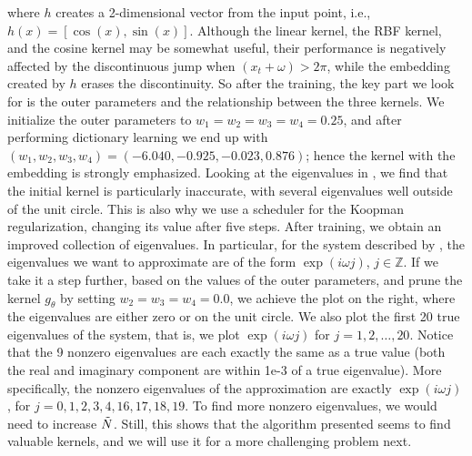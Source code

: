 \documentclass{article}
\begin{document}
where \(h\) creates a 2-dimensional vector from the input point, i.e., \(h(x) = [\cos(x), \sin(x)]\). Although the linear kernel, the RBF kernel, and the cosine kernel may be somewhat useful, their performance  is negatively affected by the discontinuous jump when \((x_t + \omega) > 2\pi\), while the embedding created by \(h\) erases the discontinuity. So after the training, the key part we look for is the outer parameters and the relationship between the three kernels. We initialize the outer parameters to \(w_1=w_2=w_3=w_4=0.25\), and after performing dictionary learning we end up with \((w_1, w_2, w_3, w_4) = (-6.040, -0.925, -0.023, 0.876)\); hence the kernel with the embedding is strongly emphasized. Looking at the eigenvalues in , we find that the initial kernel is particularly inaccurate, with several eigenvalues well outside of the unit circle. This is also why we use a scheduler for the Koopman regularization, changing its value after five steps. After training, we obtain an improved collection of eigenvalues. In particular, for the system described by , the eigenvalues we want to approximate are of the form \(\exp(i\omega j)\), \(j\in\mathbb{Z}\). If we take it a step further, based on the values of the outer parameters, and prune the kernel \(g_{\theta}\) by setting \(w_2=w_3=w_4=0.0\), we achieve the plot on the right, where the eigenvalues are either zero or on the unit circle. We also plot the first 20 true eigenvalues of the system, that is, we plot \(\exp(i\omega j)\) for \(j=1,2,\dots,20\). Notice that the 9 nonzero eigenvalues are each exactly the same as a true value (both the real and imaginary component are within 1e-3 of a true eigenvalue). More specifically, the nonzero eigenvalues of the approximation are exactly \(\exp(i\omega j)\), for \(j=0,1,2,3,4,16,17,18,19\). To find more nonzero eigenvalues, we would need to increase \(\Tilde N\). Still, this shows that the algorithm presented seems to find valuable kernels, and we will use it for a more challenging problem next.
\end{document}
